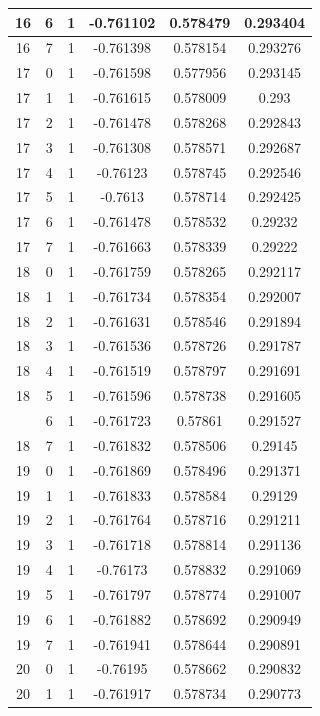 \documentclass[12pt,a4paper]{article}
\numberwithin{equation}{section}
\numberwithin{figure}{section}
\numberwithin{table}{section}
\begin{document}
\begin{longtable}{|c|c|c|c|c|c|}
16 & 6 & 1 & -0.761102 & 0.578479 & 0.293404 \\ \hline
16 & 7 & 1 & -0.761398 & 0.578154 & 0.293276 \\ \hline
17 & 0 & 1 & -0.761598 & 0.577956 & 0.293145 \\ \hline
17 & 1 & 1 & -0.761615 & 0.578009 & 0.293 \\ \hline
17 & 2 & 1 & -0.761478 & 0.578268 & 0.292843 \\ \hline
17 & 3 & 1 & -0.761308 & 0.578571 & 0.292687 \\ \hline
17 & 4 & 1 & -0.76123 & 0.578745 & 0.292546 \\ \hline
17 & 5 & 1 & -0.7613 & 0.578714 & 0.292425 \\ \hline
17 & 6 & 1 & -0.761478 & 0.578532 & 0.29232 \\ \hline
17 & 7 & 1 & -0.761663 & 0.578339 & 0.29222 \\ \hline
18 & 0 & 1 & -0.761759 & 0.578265 & 0.292117 \\ \hline
18 & 1 & 1 & -0.761734 & 0.578354 & 0.292007 \\ \hline
18 & 2 & 1 & -0.761631 & 0.578546 & 0.291894 \\ \hline
18 & 3 & 1 & -0.761536 & 0.578726 & 0.291787 \\ \hline
18 & 4 & 1 & -0.761519 & 0.578797 & 0.291691 \\ \hline
18 & 5 & 1 & -0.761596 & 0.578738 & 0.291605 \\ \hline
\pagebreak
18 & 6 & 1 & -0.761723 & 0.57861 & 0.291527 \\ \hline
18 & 7 & 1 & -0.761832 & 0.578506 & 0.29145 \\ \hline
19 & 0 & 1 & -0.761869 & 0.578496 & 0.291371 \\ \hline
19 & 1 & 1 & -0.761833 & 0.578584 & 0.29129 \\ \hline
19 & 2 & 1 & -0.761764 & 0.578716 & 0.291211 \\ \hline
19 & 3 & 1 & -0.761718 & 0.578814 & 0.291136 \\ \hline
19 & 4 & 1 & -0.76173 & 0.578832 & 0.291069 \\ \hline
19 & 5 & 1 & -0.761797 & 0.578774 & 0.291007 \\ \hline
19 & 6 & 1 & -0.761882 & 0.578692 & 0.290949 \\ \hline
19 & 7 & 1 & -0.761941 & 0.578644 & 0.290891 \\ \hline
20 & 0 & 1 & -0.76195 & 0.578662 & 0.290832 \\ \hline
20 & 1 & 1 & -0.761917 & 0.578734 & 0.290773 \\ \hline

\end{longtable}
\end{document}
